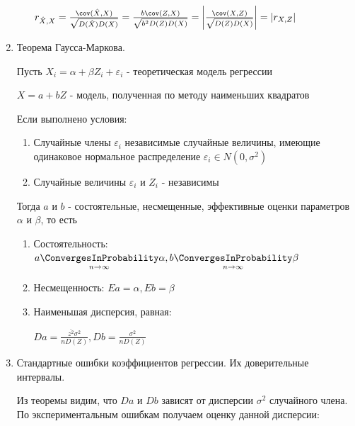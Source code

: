 \begin{enumerate}
\begin{enumerate}
\begin{MyProof}
            $r_{\hat X, X} = \frac{\cov (\hat X, X)}{\sqrt{D(\hat X) D(X)}} = \frac{b \cov (Z, X)}{\sqrt{b^2 D(Z) D(X)}} = \left|\frac{\cov (X, Z)}{\sqrt{D(Z) D(X)}}\right| = |r_{X, Z}|$
        \end{MyProof}
    \end{enumerate}

    \item Теорема Гаусса-Маркова.

    \begin{MyTheorem}
         Пусть $X_i = \alpha + \beta Z_i + \varepsilon_i$ - теоретическая модель регрессии

        $X = a + b Z$ - модель, полученная по методу наименьших квадратов

        Если выполнено условия:

        \begin{enumerate}[label=\asbuk*),ref=\asbuk*]
            \item Случайные члены $\varepsilon_i$ независимые случайные величины, имеющие одинаковое нормальное распределение $\varepsilon_i \in N(0, \sigma^2)$
            \item Случайные величины $\varepsilon_i$ и $Z_i$ - независимы
        \end{enumerate}

        Тогда $a$ и $b$ - состоятельные, несмещенные, эффективные оценки параметров $\alpha$ и $\beta$, то есть

        \begin{enumerate}
            \item Состоятельность: $a \underset{n \to \infty}{\ConvergesInProbability} \alpha, b \underset{n \to \infty}{\ConvergesInProbability} \beta$
            \item Несмещенность: $Ea = \alpha, Eb = \beta$
            \item Наименьшая дисперсия, равная:

            $D a = \frac{\overline{z^2} \sigma^2}{n D(Z)}, Db = \frac{\sigma^2}{n D(Z)}$
        \end{enumerate}
    \end{MyTheorem}


    \item Стандартные ошибки коэффициентов регрессии. Их доверительные интервалы.

    Из теоремы видим, что $Da$ и $Db$ зависят от дисперсии $\sigma^2$ случайного члена. 
    По экспериментальным ошибкам получаем оценку данной дисперсии:


\end{enumerate}
